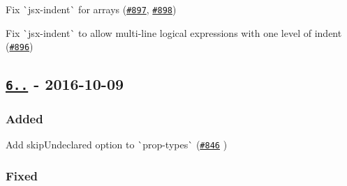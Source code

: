 \begin{DoxyItemize}
\item Fix \`{}jsx-\/indent\`{} for arrays (\href{https://github.com/yannickcr/eslint-plugin-react/issues/897}{\tt \#897}, \href{https://github.com/yannickcr/eslint-plugin-react/issues/898}{\tt \#898})
\item Fix \`{}jsx-\/indent\`{} to allow multi-\/line logical expressions with one level of indent (\href{https://github.com/yannickcr/eslint-plugin-react/pull/896}{\tt \#896})
\end{DoxyItemize}

\subsection*{\href{https://github.com/yannickcr/eslint-plugin-react/compare/v6.3.0...v6.4.0}{\tt 6..} -\/ 2016-\/10-\/09}

\subsubsection*{Added}


\begin{DoxyItemize}
\item Add {\ttfamily skip\+Undeclared} option to \`{}prop-\/types\`{} (\href{https://github.com/yannickcr/eslint-plugin-react/pull/846}{\tt \#846} )
\end{DoxyItemize}

\subsubsection*{Fixed}


